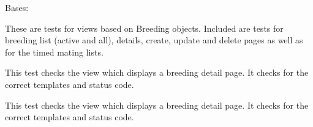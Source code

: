 \documentclass[letterpaper,10pt,english]{sphinxmanual}
\begin{document}
\begin{fulllineitems}
\label{api:mousedb.animal.tests.BreedingViewTests}
Bases: 

These are tests for views based on Breeding objects.  Included are tests for breeding list (active and all), details, create, update and delete pages as well as for the timed mating lists.


\begin{fulllineitems}
\label{api:mousedb.animal.tests.BreedingViewTests.setUp}
\end{fulllineitems}



\begin{fulllineitems}
\label{api:mousedb.animal.tests.BreedingViewTests.tearDown}
\end{fulllineitems}



\begin{fulllineitems}
\label{api:mousedb.animal.tests.BreedingViewTests.test_breeding_delete}
This test checks the view which displays a breeding detail page.  It checks for the correct templates and status code.

\end{fulllineitems}



\begin{fulllineitems}
\label{api:mousedb.animal.tests.BreedingViewTests.test_breeding_detail}
This test checks the view which displays a breeding detail page.  It checks for the correct templates and status code.

\end{fulllineitems}




\end{fulllineitems}
\end{document}

